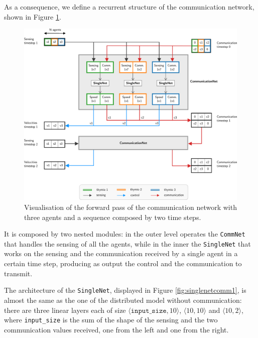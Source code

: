 As a consequence, we define a recurrent structure of the communication 
network, shown in Figure \ref{fig:commnet1}.
\begin{figure}[!htb]
	\centering
	\includegraphics[width=\textwidth]{contents/images/commnet2}
	\caption[Communication network.]{Visualisation of the forward pass of the 
		communication network with three agents and a sequence composed by two 
		time steps.}
	\label{fig:commnet1}
\end{figure}
It is composed by two nested modules: in the outer level operates the 
\texttt{CommNet} that handles the sensing of all the agents, while in the inner the 
\texttt{SingleNet} that works on the sensing and the communication received by a 
single agent in a certain time step, producing as output the control and the 
communication to transmit. 

The architecture of the \texttt{SingleNet}, displayed in Figure 
\ref{fig:singlenetcomm1}, is almost the same as the one of the distributed 
model without communication: there are three linear layers each of size 
$\langle\mathtt{input\_size}, 10\rangle$,  $\langle 10, 10\rangle$ and $\langle 
10, 2\rangle$, where \texttt{input\_size} is the sum of the shape of the sensing 
and the two communication values received, one from the left and one from the 
right.

